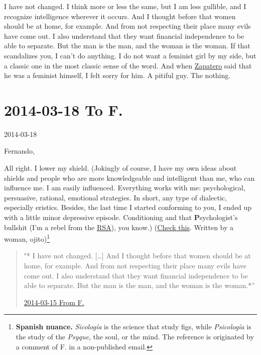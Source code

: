 \documentclass[]{book}
\let\rmarkdownfootnote\footnote%
\def\footnote{\protect\rmarkdownfootnote}
\begin{document}
I have not changed. I think more or less the same, but I am less gullible, and I recognize intelligence wherever it occurs. And I thought before that women should be at home, for example. And from not respecting their place many evils have come out. I also understand that they want financial independence to be able to separate. But the man is the man, and the woman is the woman. If that scandalizes you, I can't do anything. I do not want a feminist girl by my side, but a classic one in the most classic sense of the word. And when \href{https://es.wikipedia.org/wiki/Jos\%C3\%A9_Luis_Rodr\%C3\%ADguez_Zapatero}{Zapatero} said that he was a feminist himself, I felt sorry for him. A pitiful guy. The nothing.

\hypertarget{toF20140318}{%
\section*{2014-03-18 To F.}\label{toF20140318}}

2014-03-18

Fernando,

All right. I lower my shield. (Jokingly of course, I have my own ideas about shields and people who are more knowledgeable and intelligent than me, who can influence me. I am easily influenced. Everything works with me: psychological, persuasive, rational, emotional strategies. In short, any type of dialectic, especially eristics. Besides, the last time I started conforming to you, I ended up with a little minor depressive episode. Conditioning and that \textbf{P}sychologist's bullshit (I'm a rebel from the \href{https://en.wikipedia.org/wiki/Royal_Spanish_Academy}{RSA}), you know.) (\href{http://etimologias.dechile.net/?sicologi.a}{Check this}. Written by a woman, ojito)\footnote{\textbf{Spanish nuance.} \emph{Sicología} is the science that study figs, while \emph{Psicología} is the study of the \emph{Psyque}, the soul, or the mind. The reference is originated by a comment of F. in a non-published email.}

\begin{quote}
"* I have not changed. {[}\ldots{]} And I thought before that women should be at home, for example. And from not respecting their place many evils have come out. I also understand that they want financial independence to be able to separate. But the man is the man, and the woman is the woman.*''

\protect\hyperlink{fromF20140315}{2014-03-15 From F.}
\end{quote}
\end{document}
